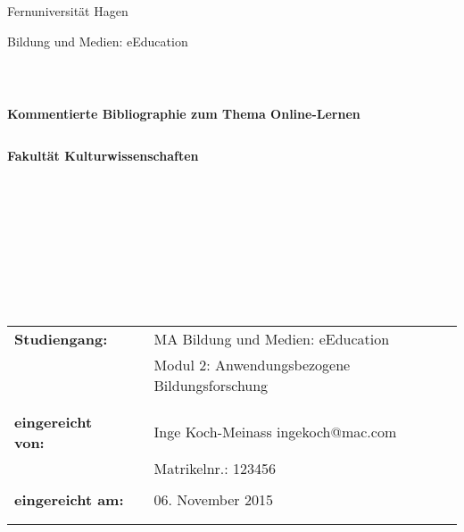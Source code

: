 \documentclass[12pt, bibliography=totoc]{scrartcl}
\begin{document}
\begin{titlepage}
\thispagestyle{empty}
\begin{center}
\color{blue}\Large{Fernuniversität Hagen}\\
\end{center}


\begin{center}
\Large{Bildung und Medien: eEducation}
\end{center}
\begin{verbatim}



\end{verbatim}
\begin{center}
\textbf{\Large{Kommentierte Bibliographie zum Thema Online-Lernen}}
\end{center}
\begin{verbatim}

\end{verbatim}
\begin{center}
\textbf{Fakultät Kulturwissenschaften}
\end{center}
\begin{verbatim}










\end{verbatim}

\begin{flushleft}
\begin{tabular}{lll}
\textbf{Studiengang:} & & MA Bildung und Medien: eEducation\\
& & Modul 2: Anwendungsbezogene Bildungsforschung\\
& & \\
& & \\
\textbf{eingereicht von:} & & {\color{magenta} Inge Koch-Meinass \flq{}ingekoch@mac.com\frq{}}\\
& & {\color{magenta}Matrikelnr.: 123456 }\\
& & \\
\textbf{eingereicht am:} & & 06. November 2015\\
& & \\
& & \\
\end{tabular}
\end{flushleft}

\end{titlepage}
  
\end{document}
